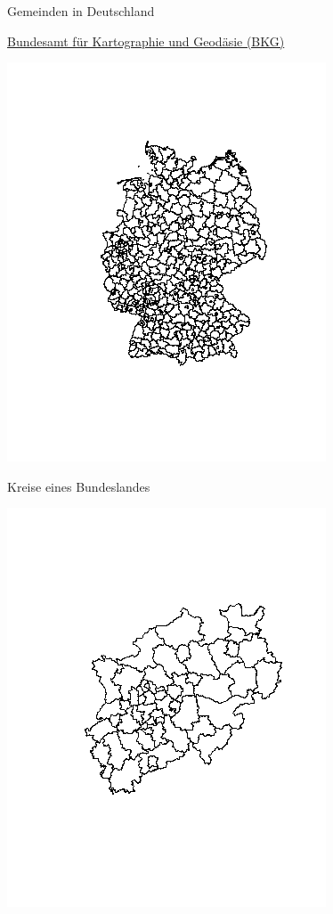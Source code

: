 \documentclass[ignorenonframetext,]{beamer}
\begin{document}
\begin{frame}{Gemeinden in Deutschland}
\protect\hypertarget{gemeinden-in-deutschland}{}

\href{http://www.geodatenzentrum.de/geodaten/gdz_rahmen.gdz_div?gdz_spr=deu\&gdz_akt_zeile=5\&gdz_anz_zeile=1\&gdz_unt_zeile=15\&gdz_user_id=0}{Bundesamt
für Kartographie und Geodäsie (BKG)}

\includegraphics{figure/vg250_krs.png}

\end{frame}

\begin{frame}{Kreise eines Bundeslandes}
\protect\hypertarget{kreise-eines-bundeslandes}{}

\includegraphics{figure/KreiseNRW.png}

\end{frame}
\end{document}
